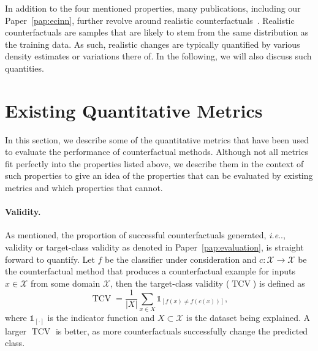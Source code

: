 \documentclass[11pt,a4paper,twoside,openright,final]{memoir}
\makeatletter
\DeclareRobustCommand\onedot{\futurelet\@let@token\@onedot}
\def\@onedot{\ifx\@let@token.\else.\null\fi\xspace}
\def\ie{\emph{i.e}\onedot} \def\Ie{\emph{I.e}\onedot}
\newcommand*{\paperref}[1]{Paper~\hyperref[#1]{\ref{#1}}}
\makeatother
\begin{document}
In addition to the four mentioned properties, many publications, including our \paperref{pap:ecinn}, further revolve around realistic counterfactuals~\cite{Singla2019, flowcounterfactuals, Rodriguez2021, VanLooveren2019}. %
Realistic counterfactuals are samples that are likely to stem from the same distribution as the training data. 
As such, realistic changes are typically quantified by various density estimates or variations there of.
In the following, we will also discuss such quantities. 

\section{Existing Quantitative Metrics}\label{sec:existing-metrics}

In this section, we describe some of the quantitative metrics that have been used to evaluate the performance of counterfactual methods.
Although not all metrics fit perfectly into the properties listed above, we describe them in the context of such properties to give an idea of the properties that can be evaluated by existing metrics and which properties that cannot. 

\paragraph{Validity.}
As mentioned, the proportion of successful counterfactuals generated, \ie, validity or target-class validity as denoted in \paperref{pap:evaluation}, is straight forward to quantify.
Let $f$ be the classifier under consideration and $c: \mathcal{X} \rightarrow \mathcal{X}$ be the counterfactual method that produces a counterfactual example for inputs $x\in \mathcal{X}$ from some domain $\mathcal{X}$, then the target-class validity ($\operatorname{TCV}$) is defined as
\begin{equation}\label{eq:tcv}
    \operatorname{TCV} = \frac{1}{|X|} \sum_{x \in X} \mathbb{1}_{[ f(x) \neq f( c(x) )]}, 
\end{equation}
where $\mathbb{1}_{[\cdot]}$ is the indicator function and $X \subset \mathcal{X}$ is the dataset being explained.
A larger $\operatorname{TCV}$ is better, as more counterfactuals successfully change the predicted class.
\end{document}
